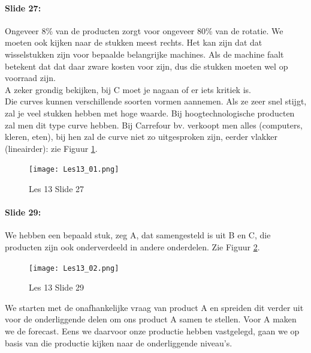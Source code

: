 \documentclass[10pt,a4paper]{report}
\begin{document}
\paragraph{Slide 27:} Ongeveer 8\% van de producten zorgt voor ongeveer 80\% van de rotatie. We moeten ook kijken naar de stukken meest rechts. Het kan zijn dat dat wisselstukken zijn voor bepaalde belangrijke machines. Als de machine faalt betekent dat dat daar zware kosten voor zijn, dus die stukken moeten wel op voorraad zijn.\\
A zeker grondig bekijken, bij C moet je nagaan of er iets kritiek is.\\
Die curves kunnen verschillende soorten vormen aannemen. Als ze zeer snel stijgt, zal je veel stukken hebben met hoge waarde. Bij hoogtechnologische producten zal men dit type curve hebben. Bij Carrefour bv. verkoopt men alles (computers, kleren, eten), bij hen zal de curve niet zo uitgesproken zijn, eerder vlakker (lineairder): zie Figuur \ref{les13_01}.

\begin{figure}[h!]
\centering
\texttt{[image: Les13\_01.png]}
\caption{Les 13 Slide 27} 
\label{les13_01}
\end{figure}

\paragraph{Slide 29:} We hebben een bepaald stuk, zeg A, dat samengesteld is uit B en C, die producten zijn ook onderverdeeld in andere onderdelen. Zie Figuur \ref{les13_02}.\\

\begin{figure}[h!]
\centering
\texttt{[image: Les13\_02.png]}
\caption{Les 13 Slide 29} 
\label{les13_02}
\end{figure}

We starten met de onafhankelijke vraag van product A en spreiden dit verder uit voor de onderliggende delen om ons product A samen te stellen. Voor A maken we de forecast. Eens we daarvoor onze productie hebben vastgelegd, gaan we op basis van die productie kijken naar de onderliggende niveau's.
\end{document}
